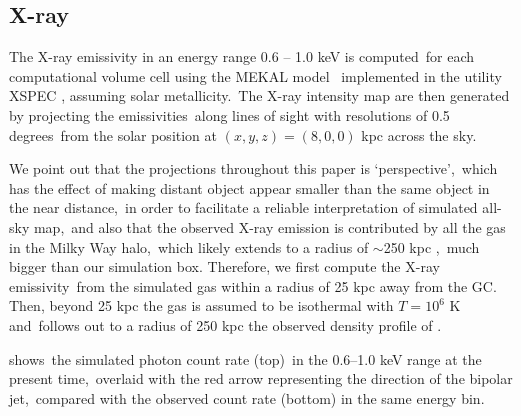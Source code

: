 \documentclass[twocolumn]{aastex631}
\begin{document}
  \subsection{X-ray}
  \label{X-ray}
  The X-ray emissivity in an energy range 0.6 -- 1.0 keV is computed\
  for each computational volume cell
  using the MEKAL model \citep{Xray-1,Xray-2,Xray-3}\
  implemented in the utility XSPEC \citep{XSPEC}, assuming solar metallicity.\
  The X-ray intensity map are then generated by projecting the emissivities\
  along lines of sight with resolutions of 0.5 degrees\
  from the solar position at $(x,y,z)=(8,0,0)$ kpc across the sky.


  We point out that the projections throughout this paper is \lq perspective\rq,\
  which has the effect of making distant object appear smaller than the same object in the near distance,\
  in order to facilitate a reliable interpretation of simulated all-sky map,\
  and also that the observed X-ray emission is contributed by all the gas in the Milky Way halo,\
  which likely extends to a radius of $\sim$250 kpc \citep{halo-radius-1,halo-radius-2},\
  much bigger than our simulation box. Therefore, we first compute the X-ray emissivity\
  from the simulated gas within a radius of 25 kpc away from the GC.
  Then, beyond 25 kpc the gas is assumed to be isothermal with $T=10^6$ K and\
  follows out to a radius of 250 kpc the observed density profile of \citep{temperature-MW}.

   shows\
  the simulated photon count rate (top)\
  in the 0.6--1.0 keV range at the present time,\
  overlaid with the red arrow representing the direction of the bipolar jet,\
  compared with the observed count rate (bottom) in the same energy bin.
\end{document}
